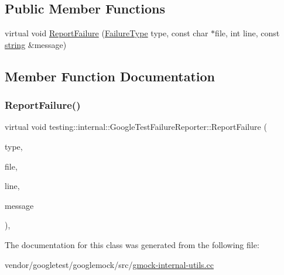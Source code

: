 \subsection*{Public Member Functions}
\begin{DoxyCompactItemize}
\item 
virtual void \hyperlink{classtesting_1_1internal_1_1_google_test_failure_reporter_a9b2f81e6c5b6e9f618fd75cc3e27e94c}{Report\+Failure} (\hyperlink{gtest__environment__test_8cc_aa43ad7e2c1c5c5150ba8d95607a96263}{Failure\+Type} type, const char $\ast$file, int line, const \hyperlink{namespacetesting_1_1internal_a8e8ff5b11e64078831112677156cb111}{string} \&message)
\end{DoxyCompactItemize}


\subsection{Member Function Documentation}
\mbox{\label{classtesting_1_1internal_1_1_google_test_failure_reporter_a9b2f81e6c5b6e9f618fd75cc3e27e94c}} 
\subsubsection{\texorpdfstring{Report\+Failure()}{ReportFailure()}}
{\footnotesize\ttfamily virtual void testing\+::internal\+::\+Google\+Test\+Failure\+Reporter\+::\+Report\+Failure (\begin{DoxyParamCaption}\item[{\hyperlink{gtest__environment__test_8cc_aa43ad7e2c1c5c5150ba8d95607a96263}{Failure\+Type}}]{type,  }\item[{const char $\ast$}]{file,  }\item[{int}]{line,  }\item[{const \hyperlink{namespacetesting_1_1internal_a8e8ff5b11e64078831112677156cb111}{string} \&}]{message }\end{DoxyParamCaption})\hspace{0.3cm}{\ttfamily [inline]}, {\ttfamily [virtual]}}



The documentation for this class was generated from the following file\+:\begin{DoxyCompactItemize}
\item 
vendor/googletest/googlemock/src/\hyperlink{gmock-internal-utils_8cc}{gmock-\/internal-\/utils.\+cc}\end{DoxyCompactItemize}

